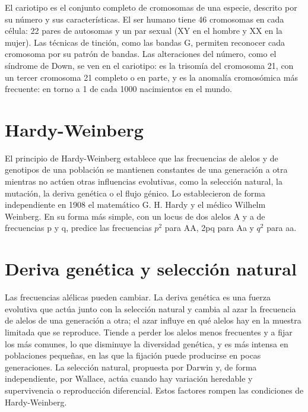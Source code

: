 \documentclass{book}
\begin{document}
El cariotipo es el conjunto completo de cromosomas de una especie, descrito por su número y sus características. El ser humano tiene 46 cromosomas en cada célula: 22 pares de autosomas y un par sexual (XY en el hombre y XX en la mujer). Las técnicas de tinción, como las bandas G, permiten reconocer cada cromosoma por su patrón de bandas. Las alteraciones del número, como el síndrome de Down, se ven en el cariotipo: es la trisomía del cromosoma 21, con un tercer cromosoma 21 completo o en parte, y es la anomalía cromosómica más frecuente: en torno a 1 de cada 1000 nacimientos en el mundo.


\section{Hardy-Weinberg}

El principio de Hardy-Weinberg establece que las frecuencias de alelos y de genotipos de una población se mantienen constantes de una generación a otra mientras no actúen otras influencias evolutivas, como la selección natural, la mutación, la deriva genética o el flujo génico. Lo establecieron de forma independiente en 1908 el matemático G. H. Hardy y el médico Wilhelm Weinberg. En su forma más simple, con un locus de dos alelos A y a de frecuencias p y q, predice las frecuencias \(p^{2}\) para AA, 2pq para Aa y \(q^{2}\) para aa.


\section{Deriva genética y selección natural}

Las frecuencias alélicas pueden cambiar. La deriva genética es una fuerza evolutiva que actúa junto con la selección natural y cambia al azar la frecuencia de alelos de una generación a otra; el azar influye en qué alelos hay en la muestra limitada que se reproduce. Tiende a perder los alelos menos frecuentes y a fijar los más comunes, lo que disminuye la diversidad genética, y es más intensa en poblaciones pequeñas, en las que la fijación puede producirse en pocas generaciones. La selección natural, propuesta por Darwin y, de forma independiente, por Wallace, actúa cuando hay variación heredable y supervivencia o reproducción diferencial. Estos factores rompen las condiciones de Hardy-Weinberg.
\end{document}

